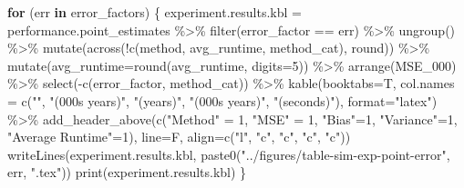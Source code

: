 \documentclass[
]{article}
\newenvironment{Shaded}{\begin{snugshade}}{\end{snugshade}}
\newcommand{\AttributeTok}[1]{\textcolor[rgb]{0.77,0.63,0.00}{#1}}
\newcommand{\ControlFlowTok}[1]{\textcolor[rgb]{0.13,0.29,0.53}{\textbf{#1}}}
\newcommand{\DecValTok}[1]{\textcolor[rgb]{0.00,0.00,0.81}{#1}}
\newcommand{\FunctionTok}[1]{\textcolor[rgb]{0.00,0.00,0.00}{#1}}
\newcommand{\NormalTok}[1]{#1}
\newcommand{\OtherTok}[1]{\textcolor[rgb]{0.56,0.35,0.01}{#1}}
\newcommand{\SpecialCharTok}[1]{\textcolor[rgb]{0.00,0.00,0.00}{#1}}
\newcommand{\StringTok}[1]{\textcolor[rgb]{0.31,0.60,0.02}{#1}}
\begin{document}
\begin{Shaded}
\begin{Highlighting}[]
\ControlFlowTok{for}\NormalTok{ (err }\ControlFlowTok{in}\NormalTok{ error\_factors) \{}
\NormalTok{  experiment.results.kbl }\OtherTok{=}\NormalTok{ performance.point\_estimates }\SpecialCharTok{\%\textgreater{}\%} 
    \FunctionTok{filter}\NormalTok{(error\_factor }\SpecialCharTok{==}\NormalTok{ err) }\SpecialCharTok{\%\textgreater{}\%} 
    \FunctionTok{ungroup}\NormalTok{() }\SpecialCharTok{\%\textgreater{}\%}
    \FunctionTok{mutate}\NormalTok{(}\FunctionTok{across}\NormalTok{(}\SpecialCharTok{!}\FunctionTok{c}\NormalTok{(method, avg\_runtime, method\_cat), round)) }\SpecialCharTok{\%\textgreater{}\%} 
    \FunctionTok{mutate}\NormalTok{(}\AttributeTok{avg\_runtime=}\FunctionTok{round}\NormalTok{(avg\_runtime, }\AttributeTok{digits=}\DecValTok{5}\NormalTok{)) }\SpecialCharTok{\%\textgreater{}\%}
    \FunctionTok{arrange}\NormalTok{(MSE\_000) }\SpecialCharTok{\%\textgreater{}\%}
    \FunctionTok{select}\NormalTok{(}\SpecialCharTok{{-}}\FunctionTok{c}\NormalTok{(error\_factor, method\_cat)) }\SpecialCharTok{\%\textgreater{}\%}
    \FunctionTok{kable}\NormalTok{(}\AttributeTok{booktabs=}\NormalTok{T, }\AttributeTok{col.names =} \FunctionTok{c}\NormalTok{(}\StringTok{""}\NormalTok{, }\StringTok{"(000\textquotesingle{}s years)"}\NormalTok{, }\StringTok{"(years)"}\NormalTok{, }\StringTok{"(000\textquotesingle{}s years)"}\NormalTok{, }\StringTok{"(seconds)"}\NormalTok{), }\AttributeTok{format=}\StringTok{"latex"}\NormalTok{) }\SpecialCharTok{\%\textgreater{}\%}
    \FunctionTok{add\_header\_above}\NormalTok{(}\FunctionTok{c}\NormalTok{(}\StringTok{"Method"} \OtherTok{=} \DecValTok{1}\NormalTok{, }\StringTok{"MSE"} \OtherTok{=} \DecValTok{1}\NormalTok{, }\StringTok{"Bias"}\OtherTok{=}\DecValTok{1}\NormalTok{, }\StringTok{"Variance"}\OtherTok{=}\DecValTok{1}\NormalTok{, }\StringTok{"Average Runtime"}\OtherTok{=}\DecValTok{1}\NormalTok{), }\AttributeTok{line=}\NormalTok{F, }\AttributeTok{align=}\FunctionTok{c}\NormalTok{(}\StringTok{"l"}\NormalTok{, }\StringTok{"c"}\NormalTok{, }\StringTok{"c"}\NormalTok{, }\StringTok{"c"}\NormalTok{, }\StringTok{"c"}\NormalTok{))}
  \FunctionTok{writeLines}\NormalTok{(experiment.results.kbl, }\FunctionTok{paste0}\NormalTok{(}\StringTok{"../figures/table{-}sim{-}exp{-}point{-}error"}\NormalTok{, err, }\StringTok{".tex"}\NormalTok{))}
  \FunctionTok{print}\NormalTok{(experiment.results.kbl)}
\NormalTok{\}}
\end{Highlighting}
\end{Shaded}
\end{document}
